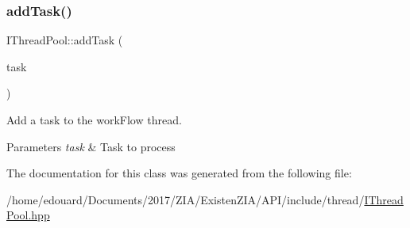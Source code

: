 \subsubsection{\texorpdfstring{add\+Task()}{addTask()}}
{\footnotesize\ttfamily I\+Thread\+Pool\+::add\+Task (\begin{DoxyParamCaption}\item[{std\+::unique\+\_\+ptr$<$ \mbox{\hyperlink{classxzia_1_1ATask}{A\+Task}} $>$}]{task }\end{DoxyParamCaption})\hspace{0.3cm}{\ttfamily [pure virtual]}}



Add a task to the work\+Flow thread. 


\begin{DoxyParams}{Parameters}
{\em task} & Task to process \\
\hline
\end{DoxyParams}


The documentation for this class was generated from the following file\+:\begin{DoxyCompactItemize}
\item 
/home/edouard/\+Documents/2017/\+Z\+I\+A/\+Existen\+Z\+I\+A/\+A\+P\+I/include/thread/\mbox{\hyperlink{IThreadPool_8hpp}{I\+Thread\+Pool.\+hpp}}\end{DoxyCompactItemize}
